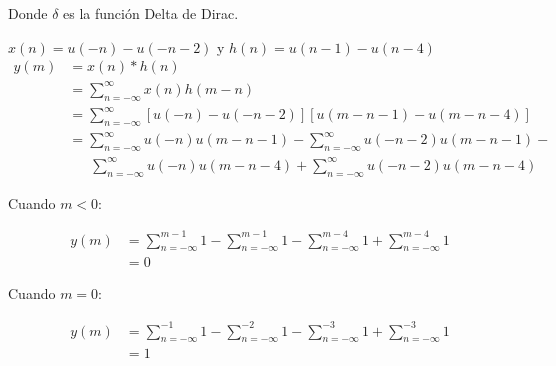 \documentclass[a4paper,12pt,final]{article}
\begin{document}
\begin{enumerate}[label=\alph*)]
          \noindent Donde $\delta$ es la función Delta de Dirac.

        $x\left(n\right) = u\left(-n\right) - u\left(-n-2\right)$ y $h\left(n\right) = u\left(n-1\right) - u\left(n-4\right)$
          \begin{equation*}
            \begin{split}
              y\left(m\right) & = x\left(n\right) * h\left(n\right) \\
                              & = \sum_{n=-\infty}^{\infty} x\left(n\right)h\left(m-n\right) \\
                              & = \sum_{n=-\infty}^{\infty} \left[u\left(-n\right) - u\left(-n-2\right)\right]
                                                            \left[u\left(m-n-1\right) - u\left(m-n-4\right)\right] \\
                              & = \sum_{n=-\infty}^{\infty} u\left(-n\right)u\left(m-n-1\right) - \sum_{n=-\infty}^{\infty} u\left(-n-2\right)u\left(m-n-1\right) - \\
                              & \phantom{=}\ \sum_{n=-\infty}^{\infty} u\left(-n\right)u\left(m-n-4\right) + \sum_{n=-\infty}^{\infty} u\left(-n-2\right)u\left(m-n-4\right)
            \end{split}
          \end{equation*}
          \vfill
          \newpage

          \noindent Cuando $m<0$:

          \begin{equation*}
            \begin{split}
              y\left(m\right) & = \sum_{n=-\infty}^{m-1} 1 -
                                  \sum_{n=-\infty}^{m-1} 1 -
                                  \sum_{n=-\infty}^{m-4} 1 +
                                  \sum_{n=-\infty}^{m-4} 1 \\
                              & = 0
            \end{split}
          \end{equation*}

          \noindent Cuando $m=0$:

          \begin{equation*}
            \begin{split}
              y\left(m\right) & = \sum_{n=-\infty}^{-1} 1 -
                                  \sum_{n=-\infty}^{-2} 1 -
                                  \sum_{n=-\infty}^{-3} 1 +
                                  \sum_{n=-\infty}^{-3} 1 \\
                              & = 1
            \end{split}
          \end{equation*}


\end{enumerate}
\end{document}

